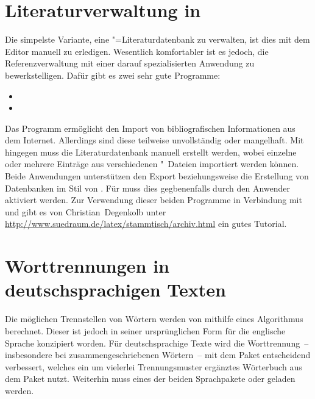 \section{Literaturverwaltung in }
%
%
Die simpelste Variante, eine "=Literaturdatenbank zu verwalten, 
ist dies mit dem Editor manuell zu erledigen. Wesentlich komfortabler ist es 
jedoch, die Referenzverwaltung mit einer darauf spezialisierten Anwendung zu 
bewerkstelligen. Dafür gibt es zwei sehr gute Programme:
%
\begin{itemize}
\item {}
\item {}
\end{itemize}
%
Das Programm  ermöglicht den Import von bibliografischen 
Informationen aus dem Internet. Allerdings sind diese teilweise unvollständig 
oder mangelhaft. Mit  hingegen muss die Literaturdatenbank 
manuell erstellt werden, wobei einzelne oder mehrere Einträge aus verschiedenen
"~Dateien importiert werden können. Beide Anwendungen unterstützen 
den Export beziehungsweise die Erstellung von Datenbanken im Stil von 
. Für  muss dies gegbenenfalls durch den 
Anwender aktiviert werden. Zur Verwendung dieser beiden Programme in Verbindung 
mit  und  gibt es von Christian~Degenkolb 
unter \mbox{\url{http://www.suedraum.de/latex/stammtisch/archiv.html}} ein 
gutes Tutorial.



\section{%
  Worttrennungen in deutschsprachigen Texten%
  \label{sec:tips:hyphenation}%
}
%
%
Die möglichen Trennstellen von Wörtern werden von  mithilfe 
eines Algorithmus berechnet. Dieser ist jedoch in seiner ursprünglichen Form 
für die englische Sprache konzipiert worden. Für deutschsprachige Texte wird 
die Worttrennung~-- insbesondere bei zusammengeschriebenen Wörtern~-- mit dem 
Paket  entscheidend verbessert, welches ein um vielerlei 
Trennungsmuster ergänztes Wörterbuch aus dem Paket  
nutzt. Weiterhin muss eines der beiden Sprachpakete  oder
 geladen werden. 

